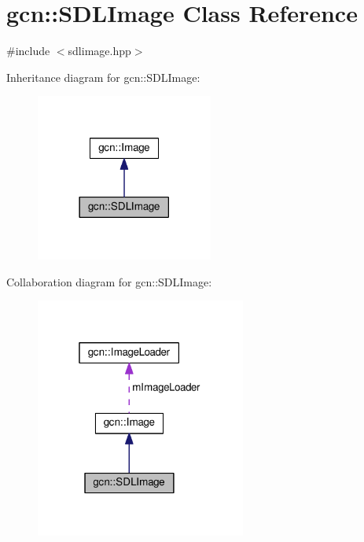 \hypertarget{classgcn_1_1SDLImage}{}\section{gcn\+:\+:S\+D\+L\+Image Class Reference}
\label{classgcn_1_1SDLImage}


{\ttfamily \#include $<$sdlimage.\+hpp$>$}



Inheritance diagram for gcn\+:\+:S\+D\+L\+Image\+:\nopagebreak
\begin{figure}[H]
\begin{center}
\leavevmode
\includegraphics[width=165pt]{classgcn_1_1SDLImage__inherit__graph}
\end{center}
\end{figure}


Collaboration diagram for gcn\+:\+:S\+D\+L\+Image\+:\nopagebreak
\begin{figure}[H]
\begin{center}
\leavevmode
\includegraphics[width=196pt]{classgcn_1_1SDLImage__coll__graph}
\end{center}
\end{figure}
